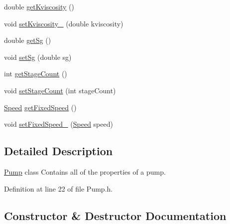 \begin{DoxyCompactItemize}
\item 
double \hyperlink{class_pump_a7b834ffb06cbfd643043e3a26ca1af6e}{get\+Kviscosity} ()
\item 
void \hyperlink{class_pump_a26d1d10908f91137f5148540ceb6520a}{set\+Kviscosity\+\_\+} (double kviscosity)
\item 
double \hyperlink{class_pump_ae30109b8533176cc1c7c80cf9df95631}{get\+Sg} ()
\item 
void \hyperlink{class_pump_a9b9773b74e0e56acece38107ab547728}{set\+Sg} (double sg)
\item 
int \hyperlink{class_pump_a2a8754f53b289dc41f3220adc4eb56e1}{get\+Stage\+Count} ()
\item 
void \hyperlink{class_pump_a28943405616a792c970b7e9bbf01c1b2}{set\+Stage\+Count} (int stage\+Count)
\item 
\hyperlink{class_pump_ae443603074ebca82f0b89209482d10b6}{Speed} \hyperlink{class_pump_ae9a63b7e616ba2ef7723d1040af241b4}{get\+Fixed\+Speed} ()
\item 
void \hyperlink{class_pump_a9e74b484f468a14076fb12d8b991e24b}{set\+Fixed\+Speed\+\_\+} (\hyperlink{class_pump_ae443603074ebca82f0b89209482d10b6}{Speed} speed)
\end{DoxyCompactItemize}


\subsection{Detailed Description}
\hyperlink{class_pump}{Pump} class Contains all of the properties of a pump. 

Definition at line 22 of file Pump.\+h.



\subsection{Constructor \& Destructor Documentation}
\mbox{\label{class_pump_a40479645281006efd81d3074f64d84ea}} 
